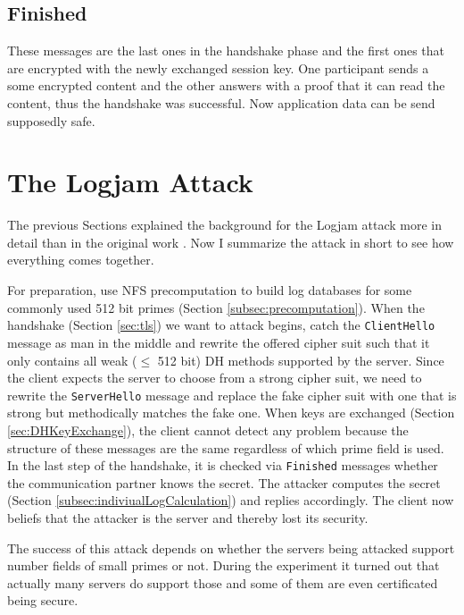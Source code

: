 \documentclass[paper=a4, fontsize=11pt]{scrartcl} %
\numberwithin{equation}{section} %
\numberwithin{figure}{section} %
\numberwithin{table}{section} %
\begin{document}
\subsection{Finished}
These messages are the last ones in the handshake phase and the first ones that are encrypted with the newly exchanged session key. One participant sends a some encrypted content and the other answers with a proof that it can read the content, thus the handshake was successful. Now application data can be send supposedly safe.

\section{The Logjam Attack}
The previous Sections explained the background for the Logjam attack more in detail than in the original work \citep{Adrian:2015:IFS:2810103.2813707}. Now I summarize the attack in short to see how everything comes together.

For preparation, use NFS precomputation to build log databases for some commonly used 512 bit primes (Section \ref{subsec:precomputation}). When the handshake (Section \ref{sec:tls}) we want to attack begins, catch the \verb|ClientHello| message as man in the middle and rewrite the offered cipher suit such that it only contains all weak ($\leq$ 512 bit) DH methods supported by the server. Since the client expects the server to choose from a strong cipher suit, we need to rewrite the \verb|ServerHello| message and replace the fake cipher suit with one that is strong but methodically matches the fake one. When keys are exchanged (Section \ref{sec:DHKeyExchange}), the client cannot detect any problem because the structure of these messages are the same regardless of which prime field is used. In the last step of the handshake, it is checked via \verb|Finished| messages whether the communication partner knows the secret. The attacker computes the secret (Section \ref{subsec:indiviualLogCalculation}) and replies accordingly. The client now beliefs that the attacker is the server and thereby lost its security.

The success of this attack depends on whether the servers being attacked support number fields of small primes or not. During the experiment it turned out that actually many servers do support those and some of them are even certificated being secure.
\end{document}
